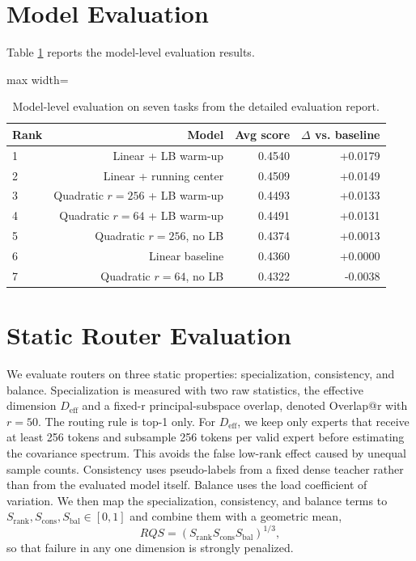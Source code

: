 \documentclass[11pt]{article}
\newcommand{\tablesize}{\footnotesize}
\begin{document}
\section{Model Evaluation}

Table \ref{tab:model-eval} reports the model-level evaluation results.

\begin{table}[H]
\centering
\tablesize
\begin{adjustbox}{max width=\linewidth}
\begin{tabular}{lrrr}
\toprule
Rank & Model & Avg score & $\Delta$ vs. baseline \\
\midrule
1 & Linear + LB warm-up & 0.4540 & +0.0179 \\
2 & Linear + running center & 0.4509 & +0.0149 \\
3 & Quadratic $r=256$ + LB warm-up & 0.4493 & +0.0133 \\
4 & Quadratic $r=64$ + LB warm-up & 0.4491 & +0.0131 \\
5 & Quadratic $r=256$, no LB & 0.4374 & +0.0013 \\
6 & Linear baseline & 0.4360 & +0.0000 \\
7 & Quadratic $r=64$, no LB & 0.4322 & -0.0038 \\
\bottomrule
\end{tabular}
\end{adjustbox}
\caption{Model-level evaluation on seven tasks from the detailed evaluation report.}
\label{tab:model-eval}
\end{table}

\section{Static Router Evaluation}

We evaluate routers on three static properties: specialization, consistency, and balance. Specialization is measured with two raw statistics, the effective dimension $D_{\mathrm{eff}}$ and a fixed-r principal-subspace overlap, denoted Overlap@r with $r=50$. The routing rule is top-1 only. For $D_{\mathrm{eff}}$, we keep only experts that receive at least 256 tokens and subsample 256 tokens per valid expert before estimating the covariance spectrum. This avoids the false low-rank effect caused by unequal sample counts. Consistency uses pseudo-labels from a fixed dense teacher rather than from the evaluated model itself. Balance uses the load coefficient of variation. We then map the specialization, consistency, and balance terms to $S_{\mathrm{rank}}, S_{\mathrm{cons}}, S_{\mathrm{bal}} \in [0,1]$ and combine them with a geometric mean,
\[
RQS = (S_{\mathrm{rank}} S_{\mathrm{cons}} S_{\mathrm{bal}})^{1/3},
\]
so that failure in any one dimension is strongly penalized.
\end{document}
